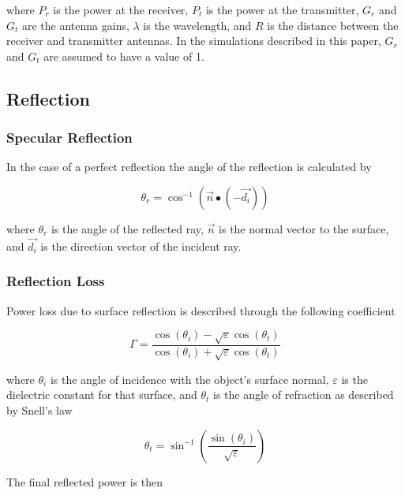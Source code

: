 where $P_r $ is the power at the receiver, $P_t$ is the power at the transmitter, $G_r$ and $G_t$ are the antenna gains, 
$\lambda$ is the wavelength, and $R$ is the distance between the receiver and transmitter antennas. In the simulations described in this paper, $G_r$ and $G_t$ are assumed to have a value of 1.

\subsection{Reflection}

\subsubsection{Specular Reflection}
In the case of a perfect reflection the angle of the reflection is calculated by

\begin{equation}
	\theta_r = \cos^{-1}(\vec{n} \bullet (-\vec{d_i}))
	\label{eqn:spec}
\end{equation}

where $\theta_r$ is the angle of the reflected ray, $\vec{n}$ is the normal vector to the surface, and $\vec{d_i}$ is the direction vector of the incident ray.

\subsubsection{Reflection Loss}
Power loss due to surface reflection is described through the following coefficient

\begin{equation}
	\Gamma = \frac{\cos(\theta_i) - \sqrt{\varepsilon}\cos(\theta_t)}{\cos(\theta_i) + \sqrt{\varepsilon}\cos(\theta_t)}
	\label{eqn:RL}
\end{equation}

where $\theta_i$ is the angle of incidence with the object's surface normal, $\varepsilon$ is the dielectric constant for that surface, and $\theta_t$ is the angle of refraction as described by Snell's law

\begin{equation}
	\theta_t = \sin^{-1}\left(\frac{\sin(\theta_i)}{\sqrt{\varepsilon}} \right)
	\label{eqn:snell}
\end{equation}

The final reflected power is then

